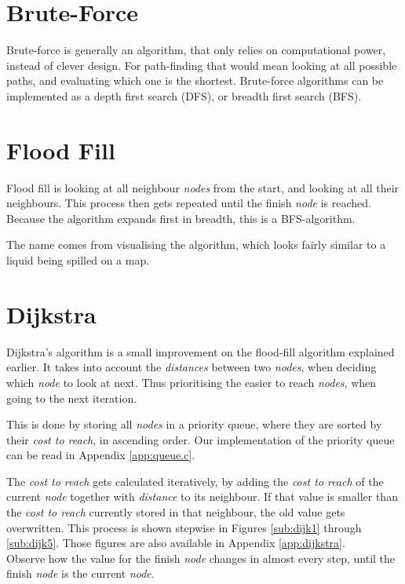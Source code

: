 \section{Brute-Force}\label{sec:brute}
Brute-force is generally an algorithm,
that only relies on computational power,
instead of clever design.
For path-finding that would mean looking at all possible paths,
and evaluating which one is the shortest.
Brute-force algorithms can be implemented as a depth first search (DFS), or breadth first search (BFS).

\section{Flood Fill}\label{sec:fill}
Flood fill is looking at all neighbour \emph{nodes} from the start,
and looking at all their neighbours.
This process then gets repeated until the finish \emph{node} is reached.
Because the algorithm expands first in breadth,
this is a BFS-algorithm.

The name comes from visualising the algorithm,
which looks fairly similar to a liquid being spilled on a map.
\cite{Jaimini2017}

\section{Dijkstra}\label{sec:dijkstra}
Dijkstra's algorithm is a small improvement on the flood-fill algorithm explained earlier.
It takes into account the \emph{distances} between two \emph{nodes},
when deciding which \emph{node} to look at next.
Thus prioritising the easier to reach \emph{nodes}, when going to the next iteration.

This is done by storing all \emph{nodes} in a priority queue,
where they are sorted by their \emph{cost to reach}, in ascending order.
Our implementation of the priority queue can be read in Appendix \ref{app:queue.c}.

The \emph{cost to reach} gets calculated iteratively,
by adding the \emph{cost to reach} of the current \emph{node} together with \emph{distance} to its neighbour.
If that value is smaller than the \emph{cost to reach} currently stored in that neighbour,
the old value gets overwritten.
This process is shown stepwise in Figures \ref{sub:dijk1} through \ref{sub:dijk5}.
Those figures are also available in Appendix \ref{app:dijkstra}.\\
Observe how the value for the finish \emph{node} changes in almost every step,
until the finish \emph{node} is the current \emph{node}.

